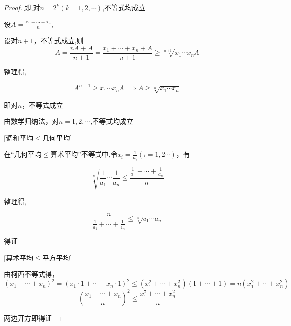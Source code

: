 \begin{proof}
    \vspace{8pt}

    即,对$n=2^k(k=1,2,\cdots)$,不等式均成立

    \vspace{8pt}
    设$A=\frac{x_1+\cdots+x_n}{n}$,

    设对$n+1$，不等式成立,则
    \begin{equation}
        A=\frac{nA+A}{n+1}=\frac{x_1+\cdots+x_n+A}{n+1}\ge \sqrt[n+1]{x_1\cdots x_n A}
    \end{equation}

    整理得,

    \begin{equation}
        A^{n+1}\ge x_1\cdots x_n A \implies A\ge \sqrt[n]{x_1 \cdots x_n}
    \end{equation}

    即对$n$，不等式成立

    由数学归纳法，对$n=1,2,\cdots$,不等式均成立

    \vspace{8pt}

    [调和平均$\le$几何平均]

    \vspace{4pt}
    在“几何平均$\le$算术平均”不等式中,令$x_i=\frac{1}{a_i}(i=1,2\cdots)$，有

    \begin{equation}
        \sqrt[n]{\frac{1}{a_1}\cdots \frac{1}{a_n}} \le \frac{\frac{1}{a_1}+\cdots+\frac{1}{a_n}}{n}
    \end{equation}

    整理得,

    \begin{equation}
        \frac{n}{\frac{1}{a_1}+\cdots+\frac{1}{a_n}}\le \sqrt[n]{a_1\cdots a_n}
    \end{equation}

    得证

    \vspace{8pt}
    [算术平均$\le$平方平均]

    由柯西不等式得，
    \begin{equation*}
        (x_1+\cdots+x_n)^2=(x_1\cdot1 +\cdots +x_n\cdot1)^2\le (x_1^2+\cdots+x_n^2)(1+\cdots+1)=n(x_1^2+\cdots+x_n^2)
    \end{equation*}
    \begin{equation}
        (\frac{x_1+\cdots+x_n}{n})^2 \le \frac{x_1^2+\cdots +x_n^2}{n}
    \end{equation}

    两边开方即得证
\end{proof}

